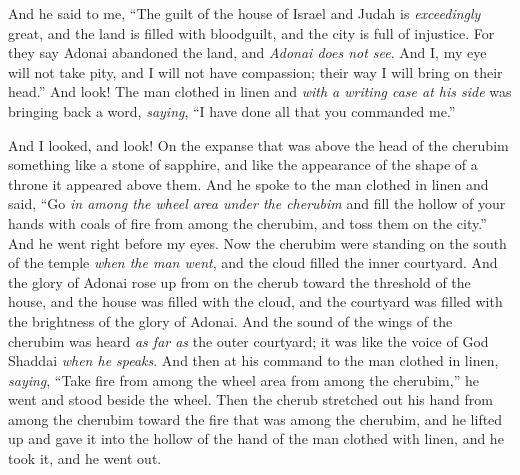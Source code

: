 \begin{biblechapter}
\verse And he said to me, “The guilt of the house of Israel and Judah is \textit{exceedingly} great, and the land is filled with bloodguilt, and the city is full of injustice. For they say Adonai abandoned the land, and \textit{Adonai does not see}.
\verse And I, my eye will not take pity, and I will not have compassion; their way I will bring on their head.”
\verse And look! The man clothed in linen and \textit{with a writing case at his side} was bringing back a word, \textit{saying}, “I have done all that you commanded me.”
\end{biblechapter}

\begin{biblechapter} %
 And I looked, and look! On the expanse that was above the head of the cherubim something like a stone of sapphire, and like the appearance of the shape of a throne it appeared above them.
\verse And he spoke to the man clothed in linen and said, “Go \textit{in among the wheel area under the cherubim} and fill the hollow of your hands with coals of fire from among the cherubim, and toss them on the city.” And he went right before my eyes.
\verse Now the cherubim were standing on the south of the temple \textit{when the man went}, and the cloud filled the inner courtyard.
\verse And the glory of Adonai rose up from on the cherub toward the threshold of the house, and the house was filled with the cloud, and the courtyard was filled with the brightness of the glory of Adonai.
\verse And the sound of the wings of the cherubim was heard \textit{as far as} the outer courtyard; it was like the voice of God Shaddai \textit{when he speaks}.
\verse And then at his command to the man clothed in linen, \textit{saying}, “Take fire from among the wheel area from among the cherubim,” he went and stood beside the wheel.
\verse Then the cherub stretched out his hand from among the cherubim toward the fire that was among the cherubim, and he lifted up and gave it into the hollow of the hand of the man clothed with linen, and he took it, and he went out.

\end{biblechapter}
